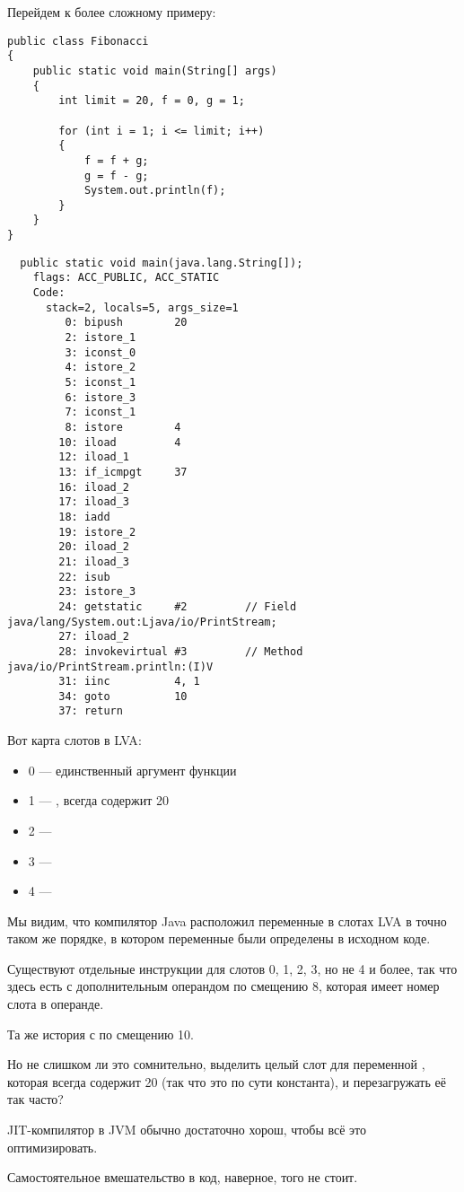 Перейдем к более сложному примеру:

\begin{lstlisting}
public class Fibonacci
{
	public static void main(String[] args)
	{ 
		int limit = 20, f = 0, g = 1;

		for (int i = 1; i <= limit; i++)
		{
			f = f + g;
			g = f - g;
			System.out.println(f); 
		}
	}
}
\end{lstlisting}

\begin{lstlisting}
  public static void main(java.lang.String[]);
    flags: ACC_PUBLIC, ACC_STATIC
    Code:
      stack=2, locals=5, args_size=1
         0: bipush        20
         2: istore_1      
         3: iconst_0      
         4: istore_2      
         5: iconst_1      
         6: istore_3      
         7: iconst_1      
         8: istore        4
        10: iload         4
        12: iload_1       
        13: if_icmpgt     37
        16: iload_2       
        17: iload_3       
        18: iadd          
        19: istore_2      
        20: iload_2       
        21: iload_3       
        22: isub          
        23: istore_3      
        24: getstatic     #2         // Field java/lang/System.out:Ljava/io/PrintStream;
        27: iload_2       
        28: invokevirtual #3         // Method java/io/PrintStream.println:(I)V
        31: iinc          4, 1
        34: goto          10
        37: return        
\end{lstlisting}
        

Вот карта слотов в \ac{LVA}:

\begin{itemize}
\item 0 --- единственный аргумент функции \main
\item 1 --- , всегда содержит 20
\item 2 --- 
\item 3 --- 
\item 4 --- 
\end{itemize}


Мы видим, что компилятор Java расположил переменные в слотах \ac{LVA} в точно таком же порядке,
в котором переменные были определены в исходном коде.


Существуют отдельные инструкции  для слотов 0, 1, 2, 3, но не 4 и более, 
так что здесь есть  с дополнительным операндом по смещению 8, 
которая имеет номер слота в операнде.

Та же история с  по смещению 10.


Но не слишком ли это сомнительно, выделить целый слот для переменной ,
которая всегда содержит 20 (так что это по сути константа), и перезагружать её так часто?

\ac{JIT}-компилятор в \ac{JVM} обычно достаточно хорош, чтобы всё это оптимизировать.

Самостоятельное вмешательство в код, наверное, того не стоит.

